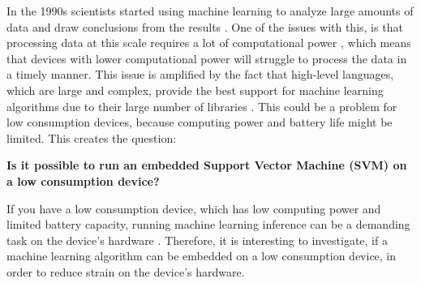 In the 1990s scientists started using machine learning to analyze large amounts of data and draw conclusions from the results \cite{marr2016short}.
One of the issues with this, is that processing data at this scale requires a lot of computational power \cite{garcia2019estimation}, which means that devices with lower computational power will struggle to process the data in a timely manner.
This issue is amplified by the fact that high-level languages, which are large and complex, provide the best support for machine learning algorithms due to their large number of libraries \cite{top5mllangs}.
This could be a problem for low consumption devices, because computing power and battery life might be limited. This creates the question: 
\begin{center}
\textbf{Is it possible to run an embedded Support Vector Machine (SVM) on a low consumption device?}
\end{center}
If you have a low consumption device, which has low computing power and limited battery capacity, running machine learning inference can be a demanding task on the device's hardware \cite{batterylifewearablesensors}. Therefore, it is interesting to investigate, if a machine learning algorithm can be embedded on a low consumption device, in order to reduce strain on the device's hardware.\\



